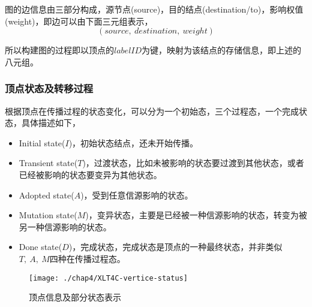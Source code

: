 图的边信息由三部分构成，源节点(source)，目的结点(destination/to)，影响权值(weight)，即边可以由下面三元组表示，
\begin{displaymath}
(source, ~destination, ~weight)
\end{displaymath}

所以构建图的过程即以顶点的$labelID$为键，映射为该结点的存储信息，即上述的八元组。

\subsubsection{顶点状态及转移过程}
\label{sec:xlt4c:state-xtran}
根据顶点在传播过程的状态变化，可以分为一个初始态，三个过程态，一个完成状态，具体描述如下，
\begin{itemize}
\item Initial state($I$)，初始状态结点，还未开始传播。
\item Transient state($T$)，过渡状态，比如未被影响的状态要过渡到其他状态，或者已经被影响的状态要变异为其他状态。
\item Adopted state($A$)，受到任意信源影响的状态。
\item Mutation state($M$)，变异状态，主要是已经被一种信源影响的状态，转变为被另一种信源影响的状态。
\item Done state($D$)，完成状态，完成状态是顶点的一种最终状态，并非类似$T, ~A, ~M$四种在传播过程态。
\end{itemize}

\begin{figure}[H]
	\centering%
	\texttt{[image: ./chap4/XLT4C-vertice-status]}
	\caption{顶点信息及部分状态表示}
	\label{fig:chap4:vertice-status}
\end{figure}


